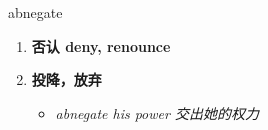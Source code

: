 
\begin{frame}
{\huge abnegate}
\begin{center}
\begin{enumerate}\Large
  \item \textbf{否认 deny, renounce}
  \item \textbf{投降，放弃}
  \begin{itemize}
    \item \em{\Large{abnegate his power 交出她的权力}}
  \end{itemize}
\end{enumerate}
\end{center}
\end{frame}

